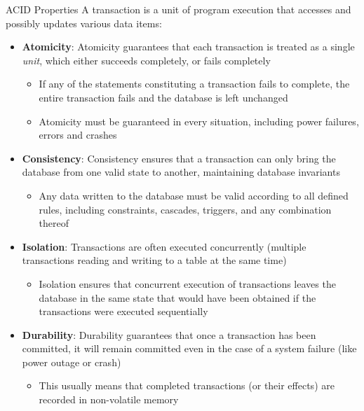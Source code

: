 \documentclass[aspectratio=169, xcolor=dvipsnames]{beamer}
\begin{document}
\begin{frame}{ACID Properties}
    A transaction is a unit of program execution that accesses and possibly updates various data items:
    \begin{itemize}[<+->]
        \item \textbf{Atomicity}: Atomicity guarantees that each transaction is treated as a single \textit{unit}, which either succeeds completely, or fails completely
        \begin{itemize}[<+->]
            \item If any of the statements constituting a transaction fails to complete, the entire transaction fails and the database is left unchanged
            \item Atomicity must be guaranteed in every situation, including power failures, errors and crashes
        \end{itemize}
        \item \textbf{Consistency}: Consistency ensures that a transaction can only bring the database from one valid state to another, maintaining database invariants
        \begin{itemize}[<+->]
            \item Any data written to the database must be valid according to all defined rules, including constraints, cascades, triggers, and any combination thereof
        \end{itemize}
        \item \textbf{Isolation}: Transactions are often executed concurrently (multiple transactions reading and writing to a table at the same time)
        \begin{itemize}[<+->]
            \item Isolation ensures that concurrent execution of transactions leaves the database in the same state that would have been obtained if the transactions were executed sequentially
        \end{itemize}
        \item \textbf{Durability}: Durability guarantees that once a transaction has been committed, it will remain committed even in the case of a system failure (like power outage or crash)
        \begin{itemize}[<+->]
            \item This usually means that completed transactions (or their effects) are recorded in non-volatile memory
        \end{itemize}
    \end{itemize}
\end{frame}
\end{document}
